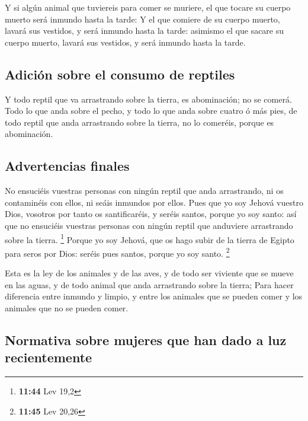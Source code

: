  Y si algún animal que tuviereis para comer se muriere, el
que tocare su cuerpo muerto será inmundo hasta la tarde:  Y
el que comiere de su cuerpo muerto, lavará sus vestidos, y será inmundo
hasta la tarde: asimismo el que sacare su cuerpo muerto, lavará sus
vestidos, y será inmundo hasta la tarde.

\hypertarget{adiciuxf3n-sobre-el-consumo-de-reptiles}{%
\subsection{Adición sobre el consumo de
reptiles}\label{adiciuxf3n-sobre-el-consumo-de-reptiles}}

 Y todo reptil que va arrastrando sobre la tierra, es
abominación; no se comerá.  Todo lo que anda sobre el
pecho, y todo lo que anda sobre cuatro ó más pies, de todo reptil que
anda arrastrando sobre la tierra, no lo comeréis, porque es abominación.

\hypertarget{advertencias-finales}{%
\subsection{Advertencias finales}\label{advertencias-finales}}

 No ensuciéis vuestras personas con ningún reptil que anda
arrastrando, ni os contaminéis con ellos, ni seáis inmundos por ellos.
 Pues que yo soy Jehová vuestro Dios, vosotros por tanto os
santificaréis, y seréis santos, porque yo soy santo: así que no
ensuciéis vuestras personas con ningún reptil que anduviere arrastrando
sobre la tierra. \footnote{\textbf{11:44} Lev 19,2}  Porque
yo soy Jehová, que os hago subir de la tierra de Egipto para seros por
Dios: seréis pues santos, porque yo soy santo. \footnote{\textbf{11:45}
  Lev 20,26}

 Esta es la ley de los animales y de las aves, y de todo
ser viviente que se mueve en las aguas, y de todo animal que anda
arrastrando sobre la tierra;  Para hacer diferencia entre
inmundo y limpio, y entre los animales que se pueden comer y los
animales que no se pueden comer.

\hypertarget{normativa-sobre-mujeres-que-han-dado-a-luz-recientemente}{%
\subsection{Normativa sobre mujeres que han dado a luz
recientemente}\label{normativa-sobre-mujeres-que-han-dado-a-luz-recientemente}}

